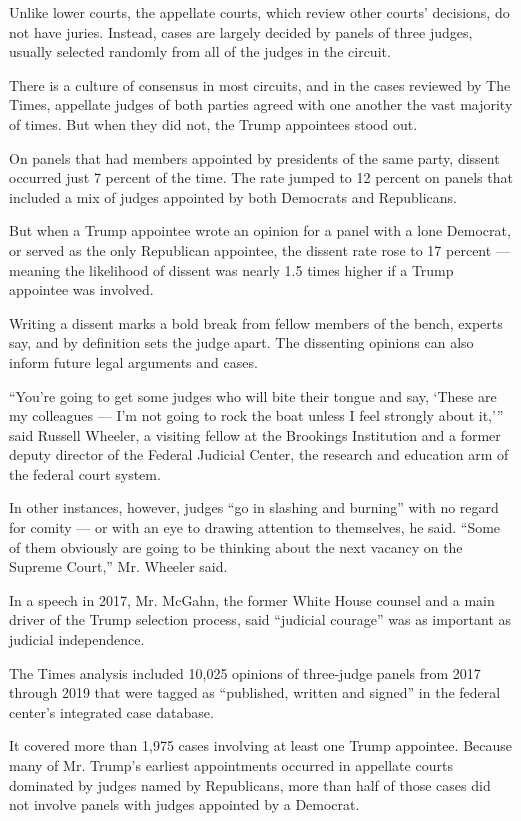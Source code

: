 Unlike lower courts, the appellate courts, which review other courts'
decisions, do not have juries. Instead, cases are largely decided by
panels of three judges, usually selected randomly from all of the judges
in the circuit.

There is a culture of consensus in most circuits, and in the cases
reviewed by The Times, appellate judges of both parties agreed with one
another the vast majority of times. But when they did not, the Trump
appointees stood out.

On panels that had members appointed by presidents of the same party,
dissent occurred just 7 percent of the time. The rate jumped to 12
percent on panels that included a mix of judges appointed by both
Democrats and Republicans.

But when a Trump appointee wrote an opinion for a panel with a lone
Democrat, or served as the only Republican appointee, the dissent rate
rose to 17 percent --- meaning the likelihood of dissent was nearly 1.5
times higher if a Trump appointee was involved.

Writing a dissent marks a bold break from fellow members of the bench,
experts say, and by definition sets the judge apart. The dissenting
opinions can also inform future legal arguments and cases.

``You're going to get some judges who will bite their tongue and say,
`These are my colleagues --- I'm not going to rock the boat unless I
feel strongly about it,''' said Russell Wheeler, a visiting fellow at
the Brookings Institution and a former deputy director of the Federal
Judicial Center, the research and education arm of the federal court
system.

In other instances, however, judges ``go in slashing and burning'' with
no regard for comity --- or with an eye to drawing attention to
themselves, he said. ``Some of them obviously are going to be thinking
about the next vacancy on the Supreme Court,'' Mr. Wheeler said.

In a speech in 2017, Mr. McGahn, the former White House counsel and a
main driver of the Trump selection process, said ``judicial courage''
was as important as judicial independence.

The Times analysis included 10,025 opinions of three-judge panels from
2017 through 2019 that were tagged as ``published, written and signed''
in the federal center's integrated case database.

It covered more than 1,975 cases involving at least one Trump appointee.
Because many of Mr. Trump's earliest appointments occurred in appellate
courts dominated by judges named by Republicans, more than half of those
cases did not involve panels with judges appointed by a Democrat.

